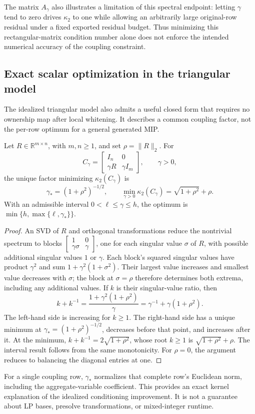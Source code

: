 The matrix $A_\gamma$ also illustrates a limitation of this spectral endpoint:
letting $\gamma$ tend to zero drives $\kappa_2$ to one while allowing an
arbitrarily large original-row residual under a fixed exported residual budget.
Thus minimizing this rectangular-matrix condition number alone does not enforce
the intended numerical accuracy of the coupling constraint.

\subsection{Exact scalar optimization in the triangular model}

The idealized triangular model also admits a useful closed form that requires
no ownership map after local whitening. It describes a common coupling factor,
not the per-row optimum for a general generated MIP.

\begin{auditproposition}
\label{prop:audit-triangular-optimum}
Let $R\in\mathbb R^{m\times n}$, with $m,n\geq1$, and set $\rho=\|R\|_2$. For
\[
 C_\gamma=\begin{bmatrix}I_n&0\\\gamma R&\gamma I_m\end{bmatrix},
 \qquad\gamma>0,
\]
the unique factor minimizing $\kappa_2(C_\gamma)$ is
\[
 \gamma_*=(1+\rho^2)^{-1/2},
 \qquad
 \min_{\gamma>0}\kappa_2(C_\gamma)=\sqrt{1+\rho^2}+\rho.
\]
With an admissible interval $0<\ell\leq\gamma\leq h$, the optimum is
$\min\{h,\max\{\ell,\gamma_*\}\}$.
\end{auditproposition}
\begin{proof}
An SVD of $R$ and orthogonal transformations reduce the nontrivial spectrum to
blocks $\left[\begin{smallmatrix}1&0\\\gamma\sigma&\gamma\end{smallmatrix}\right]$,
one for each singular value $\sigma$ of $R$, with possible additional singular
values $1$ or $\gamma$. Each block's squared singular values have product
$\gamma^2$ and sum $1+\gamma^2(1+\sigma^2)$. Their largest value increases and
smallest value decreases with $\sigma$; the block at $\sigma=\rho$ therefore
determines both extrema, including any additional values. If $k$ is their
singular-value ratio, then
\[
 k+k^{-1}=\frac{1+\gamma^2(1+\rho^2)}{\gamma}
 =\gamma^{-1}+\gamma(1+\rho^2).
\]
The left-hand side is increasing for $k\geq1$. The right-hand side has a unique
minimum at $\gamma_*=(1+\rho^2)^{-1/2}$, decreases before that point, and increases
after it. At the minimum, $k+k^{-1}=2\sqrt{1+\rho^2}$, whose root $k\geq1$ is
$\sqrt{1+\rho^2}+\rho$. The interval result follows from the same monotonicity.
For $\rho=0$, the argument reduces to balancing the diagonal entries at one.
\end{proof}

For a single coupling row, $\gamma_*$ normalizes that complete row's Euclidean
norm, including the aggregate-variable coefficient. This provides an exact
kernel explanation of the idealized conditioning improvement. It is not a
guarantee about LP bases, presolve transformations, or mixed-integer runtime.
